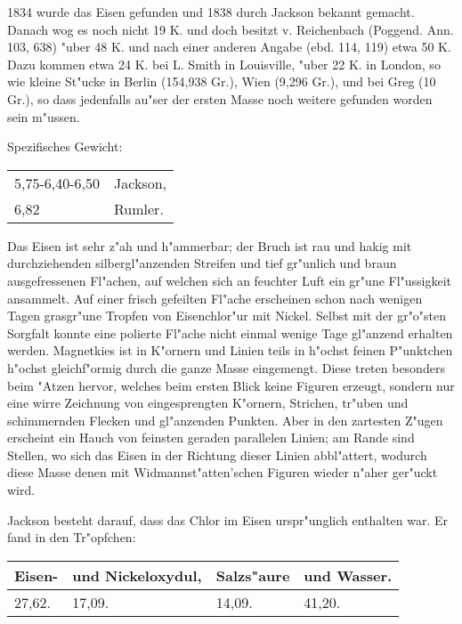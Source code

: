 \documentclass[a4paper, 11pt, oneside]{article}
\begin{document}
1834 wurde das Eisen gefunden und 1838 durch Jackson bekannt gemacht. Danach wog es noch nicht 19 K. und doch besitzt v. Reichenbach (Poggend. Ann. 103, 638) "uber 48 K. und nach einer anderen Angabe (ebd. 114, 119) etwa 50 K. Dazu kommen etwa 24 K. bei L. Smith in Louisville, "uber 22 K. in London, so wie kleine St"ucke in Berlin (154,938 Gr.), Wien (9,296 Gr.), und bei Greg (10 Gr.), so dass jedenfalls au"ser der ersten Masse noch weitere gefunden worden sein m"ussen.

Spezifisches Gewicht:
\begin{table}[!ht]
    \centering\swabfamily\Large
    \begin{tabular}{l l}
        5,75-6,40-6,50 & Jackson,\\
        6,82 & Rumler.
    \end{tabular}
\end{table}

Das Eisen ist sehr z"ah und h"ammerbar; der Bruch ist rau und hakig mit durchziehenden silbergl"anzenden Streifen und tief gr"unlich und braun ausgefressenen Fl"achen, auf welchen sich an feuchter Luft ein gr"une Fl"ussigkeit ansammelt. Auf einer frisch gefeilten Fl"ache erscheinen schon nach wenigen Tagen grasgr"une Tropfen von Eisenchlor"ur mit Nickel. Selbst mit der gr"o"sten Sorgfalt konnte eine polierte Fl"ache nicht einmal wenige Tage gl"anzend erhalten werden. Magnetkies ist in K"ornern und Linien teils in h"ochst feinen P"unktchen h"ochst gleichf"ormig durch die ganze Masse eingemengt. Diese treten besonders beim "Atzen hervor, welches beim ersten Blick keine Figuren erzeugt, sondern nur eine wirre Zeichnung von eingesprengten K"ornern, Strichen, tr"uben und schimmernden Flecken und gl"anzenden Punkten. Aber in den zartesten Z"ugen erscheint ein Hauch von feinsten geraden parallelen Linien; am Rande sind Stellen, wo sich das Eisen in der Richtung dieser Linien abbl"attert, wodurch diese Masse denen mit Widmannst"atten'schen Figuren wieder n"aher ger"uckt wird.

Jackson besteht darauf, dass das Chlor im Eisen urspr"unglich enthalten war. Er fand in den Tr"opfchen:
\begin{table}[H]
    \centering\swabfamily\Large
    \begin{tabular}{l l l l}
        Eisen- & und Nickeloxydul, & Salzs"aure & und Wasser. \\ \hline
        27,62. & 17,09. & 14,09. & 41,20. \\
    \end{tabular}
\end{table}
\end{document}
